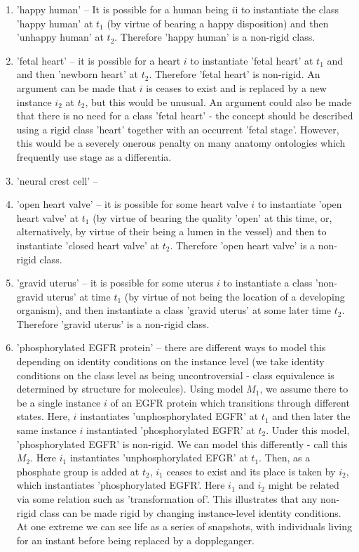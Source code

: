 \documentclass{bioinfo}
\begin{document}
\begin{enumerate}
  \item 'happy human' -- It is possible for a human being $i$i to
    instantiate the class 'happy human' at $t_1$ (by virtue of bearing
    a happy disposition) and then 'unhappy human' at $t_2$. Therefore
    'happy human' is a non-rigid class.

  \item 'fetal heart' -- it is possible for a heart $i$ to instantiate
    'fetal heart' at $t_1$ and and then 'newborn heart' at
    $t_2$. Therefore 'fetal heart' is non-rigid. An argument can be
    made that $i$ is ceases to exist and is replaced by a new instance
    $i_2$ at $t_2$, but this would be unusual. An argument could also
    be made that there is no need for a class 'fetal heart' - the
    concept should be described using a rigid class 'heart' together
    with an occurrent 'fetal stage'. However, this would be a severely
    onerous penalty on many anatomy ontologies which frequently use
    stage as a differentia.

  \item 'neural crest cell' --

  \item 'open heart valve' -- it is possible for some heart valve $i$
    to instantiate 'open heart valve' at $t_1$ (by virtue of bearing
    the quality 'open' at this time, or, alternatively, by virtue of
    their being a lumen in the vessel) and then to instantiate 'closed
    heart valve' at $t_2$. Therefore 'open heart valve' is a non-rigid
    class.

  \item 'gravid uterus' -- it is possible for some uterus $i$ to
    instantiate a class 'non-gravid uterus' at time $t_1$ (by virtue
    of not being the location of a developing organism), and then
    instantiate a class 'gravid uterus' at some later time
    $t_2$. Therefore 'gravid uterus' is a non-rigid class.

  \item 'phosphorylated EGFR protein' -- there are different ways to
    model this depending on identity conditions on the instance level
    (we take identity conditions on the class level as being
    uncontroversial - class equivalence is determined by structure for
    molecules). Using model $M_1$, we assume there to be a single
    instance $i$ of an EGFR protein which transitions through
    different states. Here, $i$ instantiates 'unphosphorylated EGFR'
    at $t_1$ and then later the same instance $i$ instantiated
    'phosphorylated EGFR' at $t_2$. Under this model, 'phosphorylated
    EGFR' is non-rigid. We can model this differently - call this
    $M_2$. Here $i_1$ instantiates 'unphosphorylated EFGR' at
    $t_1$. Then, as a phosphate group is added at $t_2$, $i_1$ ceases
    to exist and its place is taken by $i_2$, which instantiates
    'phosphorylated EGFR'. Here $i_1$ and $i_2$ might be related via
    some relation such as 'transformation of'. This illustrates that
    any non-rigid class can be made rigid by changing instance-level
    identity conditions. At one extreme we can see life as a series of
    snapshots, with individuals living for an instant before being
    replaced by a doppleganger.


\end{enumerate}
\end{document}
